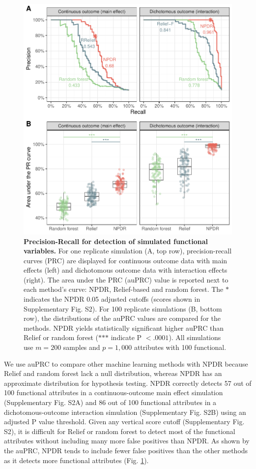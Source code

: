 \documentclass{bioinfo}
\begin{document}
\begin{figure}[!tbp]
\centerline{\includegraphics[trim = 0 0 0 0, scale = 0.58]{../../figs/pr_compare_100.pdf}}
\caption{{\bf Precision-Recall for detection of simulated functional variables.} For one replicate simulation (A, top row), precision-recall curves (PRC) are displayed for continuous outcome data with main effects (left) and dichotomous outcome data with interaction effects (right). The area under the PRC (auPRC) value is reported next to each method's curve: NPDR, Relief-based and random forest. The $\ast$ indicates the NPDR 0.05 adjusted cutoffs (scores shown in Supplementary Fig. S2). For 100 replicate simulations (B, bottom row), the distributions of the auPRC values are compared for the methods. NPDR yields statistically significant higher auPRC than Relief or random forest ($\ast$$\ast$$\ast$ indicate P $<.0001$). All simulations use $m = 200$ samples and $p = 1,000$ attributes with 100 functional.}
\label{fig:pr_curve}
\end{figure}

We use auPRC to compare other machine learning methods with NPDR because Relief and random forest lack a null distribution, whereas NPDR has an approximate distribution for hypothesis testing.
NPDR correctly detects 57 out of 100 functional attributes in a continuous-outcome main effect simulation (Supplementary Fig. S2A) and 86 out of 100 functional attributes in a dichotomous-outcome interaction simulation (Supplementary Fig. S2B) using an adjusted P value threshold.
Given any vertical score cutoff (Supplementary Fig. S2), it is difficult for Relief or random forest to detect most of the functional attributes without including many more false positives than NPDR.
As shown by the auPRC, NPDR tends to include fewer false positives than the other methods as it detects more functional attributes (Fig. \ref{fig:pr_curve}).
\end{document}
